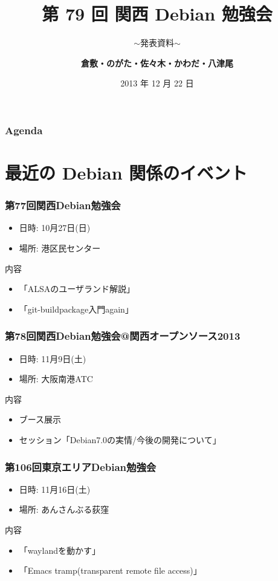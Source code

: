 \documentclass[cjk,dvipdfmx,10pt,compress,%
hyperref={bookmarks=true,bookmarksnumbered=true,bookmarksopen=false,%
colorlinks=false,%
pdftitle={第 79 回 関西 Debian 勉強会},%
pdfauthor={倉敷・のがた・佐々木・かわだ・八津尾},%
pdfsubject={資料},%
}]{beamer}
\title{第 79 回 関西 Debian 勉強会}
\subtitle{$\sim$発表資料$\sim$}
\author[かわだ てつたろう]{{\large\bf 倉敷・のがた・佐々木・かわだ・八津尾}}
\institute[Debian JP]{{\normalsize\tt 関西 Debian 勉強会}}
\date{{\small 2013 年 12 月 22 日}}
\begin{document}
\settitleslide
\begin{frame}
\titlepage
\end{frame}
\setdefaultslide

\begin{frame}[fragile]
\frametitle{Agenda}

\tableofcontents

\end{frame}

\section{最近の Debian 関係のイベント}


\begin{frame}[fragile]
  \frametitle{第77回関西Debian勉強会}
  \begin{itemize}
  \item 日時: 10月27日(日)
  \item 場所: 港区民センター
  \end{itemize}
  \begin{block}{内容}
    \begin{itemize}
    \item 「ALSAのユーザランド解説」
    \item 「git-buildpackage入門again」
    \end{itemize}
  \end{block}
\end{frame}

\begin{frame}[fragile]
  \frametitle{第78回関西Debian勉強会@関西オープンソース2013}
  \begin{itemize}
  \item 日時: 11月9日(土)
  \item 場所: 大阪南港ATC
  \end{itemize}
  \begin{block}{内容}
    \begin{itemize}
    \item ブース展示
    \item セッション「Debian7.0の実情/今後の開発について」
    \end{itemize}
  \end{block}
\end{frame}

\begin{frame}[fragile]
  \frametitle{第106回東京エリアDebian勉強会}
  \begin{itemize}
  \item 日時: 11月16日(土)
  \item 場所: あんさんぶる荻窪
  \end{itemize}
  \begin{block}{内容}
    \begin{itemize}
    \item 「waylandを動かす」
    \item 「Emacs tramp(transparent remote file access)」
    \end{itemize}
  \end{block}
\end{frame}
\end{document}
